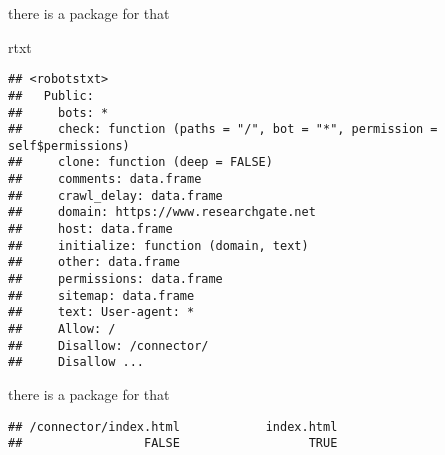 \documentclass[ignorenonframetext,]{beamer}
\newenvironment{Shaded}{\begin{snugshade}}{\end{snugshade}}
\newcommand{\KeywordTok}[1]{\textcolor[rgb]{0.13,0.29,0.53}{\textbf{{#1}}}}
\newcommand{\StringTok}[1]{\textcolor[rgb]{0.31,0.60,0.02}{{#1}}}
\newcommand{\NormalTok}[1]{{#1}}
\begin{document}
\begin{frame}[fragile]{there is a package for that}

\begin{Shaded}
\begin{Highlighting}[]
\NormalTok{rtxt}
\end{Highlighting}
\end{Shaded}

\begin{verbatim}
## <robotstxt>
##   Public:
##     bots: *
##     check: function (paths = "/", bot = "*", permission = self$permissions) 
##     clone: function (deep = FALSE) 
##     comments: data.frame
##     crawl_delay: data.frame
##     domain: https://www.researchgate.net
##     host: data.frame
##     initialize: function (domain, text) 
##     other: data.frame
##     permissions: data.frame
##     sitemap: data.frame
##     text: User-agent: *
##     Allow: /
##     Disallow: /connector/
##     Disallow ...
\end{verbatim}

\end{frame}

\begin{frame}[fragile]{there is a package for that}

\begin{Shaded}
\end{Shaded}

\begin{verbatim}
## /connector/index.html            index.html 
##                 FALSE                  TRUE
\end{verbatim}

\end{frame}
\end{document}
